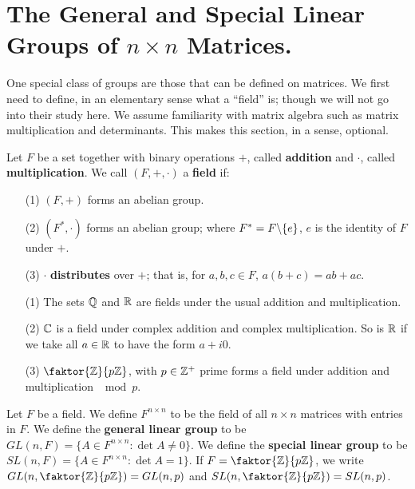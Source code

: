 \section{The General and Special Linear Groups of $n \times n$ Matrices.}
\label{section1}

One special class of groups are those that can be defined on matrices. We first
need to define, in an elementary sense what a ``field'' is; though we will not
go into their study here. We assume familiarity with matrix algebra such as
matrix multiplication and determinants. This makes this section, in a sense,
optional.

\begin{definition}
    Let $F$ be a set together with binary operations  $+$, called
    \textbf{addition} and $\cdot$, called  \textbf{multiplication}. We call
    $(F,+,\cdot)$ a \textbf{field} if:
    \begin{enumerate}
        \item[(1)] $(F,+)$ forms an abelian group.

        \item[(2)] $(F^*,\cdot)$ forms an abelian group; where
            $F^*=F \backslash \{e\}$, $e$ is the identity of  $F$ under  $+$.

        \item[(3)] $\cdot$  \textbf{distributes} over $+$; that is, for  $a,b,c
            \in F$,  $a(b+c)=ab+ac$.
    \end{enumerate}
\end{definition}

\begin{example}
    \begin{enumerate}
        \item[(1)] The sets $\mathbb{Q}$ and  $\mathbb{R}$ are fields under the usual addition
            and multiplication.

        \item[(2)]  $\mathbb{C}$ is a field under complex addition and complex
            multiplication. So is  $\mathbb{R}$ if we take all $a \in \mathbb{R}$ to have the
            form  $a+i0$.

        \item[(3)] $\faktor{\Z}{p\Z}$, with $p \in \mathbb{Z}^+$ prime forms a field
            under addition and multiplication  $\mod{p}$.
    \end{enumerate}
\end{example}

\begin{definition}
    Let $F$ be a field. We define  $F^{n \times n}$ to be the field of all $n
    \times n$ matrices with entries in $F$. We define the \textbf{general linear
    group} to be $GL(n,F)=\{A \in F^{n \times n} : \det{A} \neq 0\}$. We define
    the \textbf{special linear group} to be $SL(n,F)=\{A \in F^{n \times n} :
    \det{A}=1\}$. If $F=\faktor{\Z}{p\Z}$, we write
    $GL(n,\faktor{\Z}{p\Z})=GL(n,p)$ and $SL(n,\faktor{\Z}{p\Z})=SL(n,p)$.
\end{definition}

